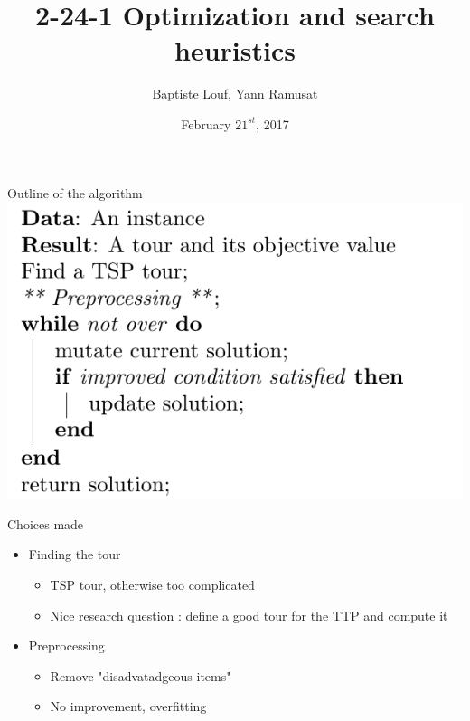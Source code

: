 \documentclass{beamer}
\title[Your Short Title]{2-24-1 Optimization and search heuristics}
\author{Baptiste Louf, Yann Ramusat}
\date{February $21^{st}$, 2017}
\begin{document}
\begin{frame}
  \titlepage
\end{frame}


\begin{frame}{Outline of the algorithm}
\includegraphics[scale=0.5]{algo}
\end{frame}

\begin{frame}{Choices made}
\begin{itemize}
\item Finding the tour
\begin{itemize}
\item TSP tour, otherwise too complicated
\item Nice research question : define a good tour for the TTP and compute it
\end{itemize}
\item Preprocessing
\begin{itemize}
\item Remove "disadvatadgeous items"
\item No improvement, overfitting
\end{itemize}
\end{itemize}

\end{frame}
\end{document}
